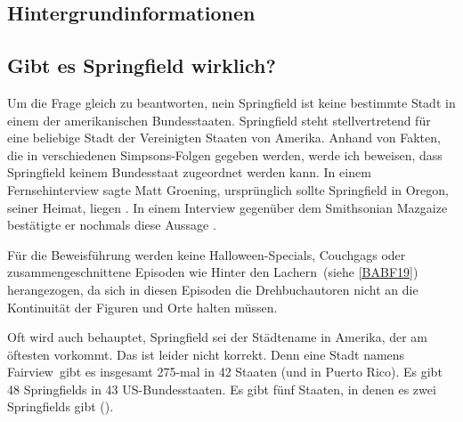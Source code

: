 \begin{appendix}

\chapter{Hintergrundinformationen}

\section{Gibt es Springfield wirklich?}\label{ExistiertSpringfield}
Um die Frage gleich zu beantworten, nein Springfield ist keine bestimmte Stadt in einem der amerikanischen Bundesstaaten. Springfield steht stellvertretend für eine beliebige Stadt der Vereinigten Staaten von Amerika. Anhand von Fakten, die in verschiedenen Simpsons-Folgen gegeben werden, werde ich beweisen, dass Springfield keinem Bundesstaat zugeordnet werden kann. In einem Fernsehinterview sagte Matt Groening, ursprünglich sollte Springfield in Oregon, seiner Heimat, liegen \cite{InterviewGroening}. In einem Interview gegenüber dem Smithsonian Mazgaize bestätigte er nochmals diese Aussage \cite{Smithsonian}.

Für die Beweisführung werden keine Halloween-Specials, Couchgags oder zusammengeschnittene Episoden wie \glqq Hinter den Lachern\grqq\ (siehe \ref{BABF19}) herangezogen, da sich in diesen Episoden die Drehbuchautoren nicht an die Kontinuität der Figuren und Orte halten müssen.

Oft wird auch behauptet, Springfield sei der Städtename in Amerika, der am öftesten vorkommt. Das ist leider nicht korrekt. Denn eine Stadt namens \glqq Fairview\grqq\ gibt es insgesamt 275-mal in 42 Staaten (und in Puerto Rico). Es gibt 48 Springfields in 43 US-Bundesstaaten. Es gibt fünf Staaten, in denen es zwei Springfields gibt (\cite{Reiss19}).


\end{appendix}
